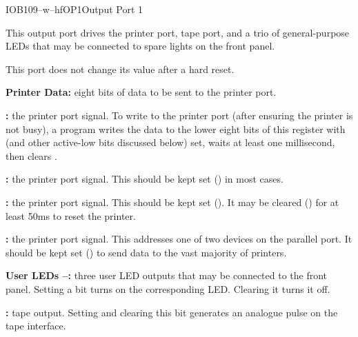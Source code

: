 \begin{ioport}{IOB}{109}{--w--hf}{OP1}{Output Port 1}

  This output port drives the printer port, tape port, and a trio of
  general-purpose LEDs that may be connected to spare lights on the front
  panel.

  This port does not change its value after a hard reset.

  \begin{cbitfield}
  \end{cbitfield}

  \begin{description}
  \item{\bfseries Printer Data:} eight bits of data to be sent to the printer port.
  \item{\bfseries {}:} the printer port  signal. To write to
    the printer port (after ensuring the printer is not busy), a program writes
    the data to the lower eight bits of this register with  (and other
    active-low bits discussed below) set, waits at least one millisecond, then
    clears .
  \item{\bfseries {}:} the printer port  signal. This
    should be kept set () in most cases.
  \item{\bfseries {}:} the printer port  signal. This should
    be kept set (). It may be cleared () for at least 50ms to
    reset the printer.
  \item{\bfseries {}:} the printer port  signal. This
    addresses one of two devices on the parallel port. It should be kept set
    () to send data to the vast majority of printers.
  \item{\bfseries User LEDs –:} three user LED outputs that
    may be connected to the front panel. Setting a bit turns on the
    corresponding LED. Clearing it turns it off.
  \item{\bfseries {}:} tape output. Setting and clearing this bit
    generates an analogue pulse on the tape interface.
  \end{description}
\end{ioport}

